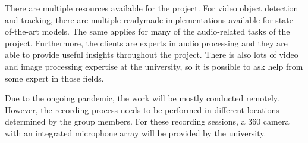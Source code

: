 There are multiple resources available for the project. For video object detection and tracking, there are multiple
readymade implementations available for state-of-the-art models. The same applies for many of the audio-related
tasks of the project. Furthermore, the clients are experts in audio processing and they are able to provide useful
insights throughout the project. There is also lots of video and image processing expertise at the university, so it
is possible to ask help from some expert in those fields.

Due to the ongoing pandemic, the work will be mostly conducted remotely. However, the recording process needs to be
performed in different locations determined by the group members. For these recording sessions, a 360 camera with an
integrated microphone array will be provided by the university.
